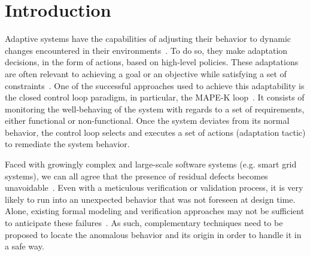 \section{Introduction}
 

Adaptive systems have the capabilities of adjusting their behavior to dynamic changes encountered in their environments~\cite{DBLP:conf/dagstuhl/BrunSGGKLMPS09}. 
To do so, they make adaptation decisions, in the form of actions, based on high-level policies. 
These adaptations are often relevant to achieving a goal or an objective while satisfying a set of constraints~\cite{DBLP:journals/eswa/Macias-EscrivaHTH13}.
One of the successful approaches used to achieve this adaptability is the closed control loop paradigm, in particular, the MAPE-K loop~\cite{kephart2003vision}. %
It consists of monitoring the well-behaving of the system with regards to a set of requirements, either functional or non-functional. 
Once the system deviates from its normal behavior, the control loop selects and executes a set of actions (adaptation tactic) to remediate the system behavior.

Faced with growingly complex and large-scale software systems (e.g. smart grid systems), we can all agree that the presence of residual defects becomes unavoidable~\cite{DBLP:conf/icse/BarbosaLMJ17}. %
Even with a meticulous verification or validation process, it is very likely to run into an unexpected behavior that was not foreseen at design time. Alone, existing formal modeling and verification approaches may not be sufficient to anticipate these failures~\cite{DBLP:conf/icse/TaharaOH17}. 
As such, complementary techniques need to be proposed to locate the anomalous behavior and its origin in order to handle it in a safe way.  


